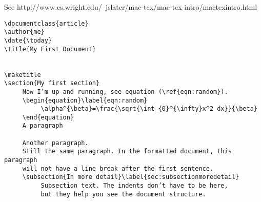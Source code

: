 
\comment See http://www.cs.wright.edu/~jslater/mac-tex/mac-tex-intro/mactexintro.html

\begin{lstlisting}  
\documentclass{article}  
\author{me}  
\date{\today}  
\title{My First Document}  
 
  
\maketitle  
\section{My first section}  
     Now I’m up and running, see equation (\ref{eqn:random}).  
     \begin{equation}\label{eqn:random}  
          \alpha^{\beta}=\frac{\sqrt{\int_{0}^{\infty}x^2 dx}}{\beta}  
     \end{equation}  
     A paragraph  
 
     Another paragraph.  
     Still the same paragraph. In the formatted document, this paragraph  
     will not have a line break after the first sentence.  
     \subsection{In more detail}\label{sec:subsectionmoredetail}  
          Subsection text. The indents don’t have to be here,  
          but they help you see the document structure.  
  
\end{lstlisting}  
